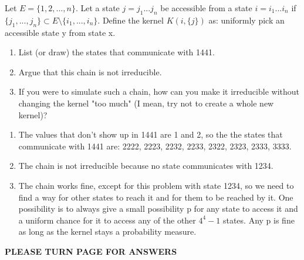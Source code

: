 \begin{Exercise}
Let $E = \{1, 2, ..., n\}$. Let a state $j = j_1...j_n$ be accessible from a state $i = i_1...i_n$ if $\{j_1, ..., j_n\} \subset E \setminus \{i_1, ..., i_n\} $. Define the kernel $K(i, \{j\})$ as: uniformly pick an accessible state y from state x. 
\begin{enumerate}[label=(\alph*)]
\item List (or draw) the states that communicate with 1441.
\item Argue that this chain is not irreducible.
\item If you were to simulate such a chain, how can you make it irreducible without changing the kernel "too much" (I mean, try not to create a whole new kernel)?
\end{enumerate}
\end{Exercise}
\begin{Answer}
\begin{enumerate}[label=(\alph*)]
\item The values that don't show up in 1441 are 1 and 2, so the the states that communicate with 1441 are: 2222, 2223, 2232, 2233, 2322, 2323, 2333, 3333.
\item The chain is not irreducible because no state communicates with 1234.
\item The chain works fine, except for this problem with state 1234, so we need to find a way for other states to reach it and for them to be reached by it. One possibility is to always give a small possibility p for any state to access it and a uniform chance for it to access any of the other $4^4-1$ states. Any p is fine as long as the kernel stays a probability measure.
\end{enumerate}
\end{Answer}

\vspace{8cm}
\centerline{\textbf{\uppercase{PLEASE TURN PAGE FOR ANSWERS}}}



\clearpage
\shipoutAnswer
